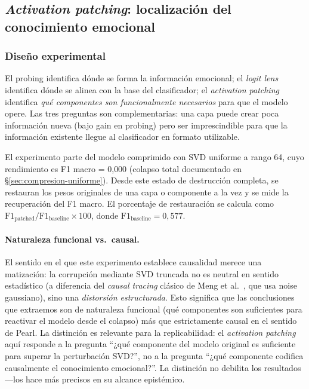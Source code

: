 \subsection{\emph{Activation patching}: localización del conocimiento emocional}
\label{sec:activation-patching}

\subsubsection{Diseño experimental}

El probing identifica dónde se forma la información emocional;
el \emph{logit lens} identifica dónde se alinea con la base del
clasificador; el \emph{activation patching} identifica \emph{qué componentes
son funcionalmente necesarios} para que el modelo opere. Las tres
preguntas son complementarias: una capa puede crear poca información
nueva (bajo gain en probing) pero ser imprescindible para que la
información existente llegue al clasificador en formato utilizable.

El experimento parte del modelo comprimido con SVD uniforme a rango 64,
cuyo rendimiento es F1 macro = 0{,}000 (colapso total documentado en
\S\ref{sec:compresion-uniforme}). Desde este estado de destrucción
completa, se restauran los pesos originales de una capa o componente
a la vez y se mide la recuperación del F1 macro. El porcentaje de
restauración se calcula como
$\text{F1}_{\text{patched}} / \text{F1}_{\text{baseline}} \times 100$,
donde $\text{F1}_{\text{baseline}} = 0{,}577$.

\paragraph{Naturaleza funcional vs.\ causal.}
El sentido en el que este experimento establece causalidad merece una matización: la corrupción mediante SVD truncada no es neutral
en sentido estadístico (a diferencia del \emph{causal tracing} clásico de
Meng et al.~\cite{meng2022locating}, que usa noise gaussiano), sino una
\emph{distorsión estructurada}. Esto significa que las conclusiones
que extraemos son de naturaleza funcional (qué componentes
son suficientes para reactivar el modelo desde el colapso) más que
estrictamente causal en el sentido de Pearl. La distinción es
relevante para la replicabilidad: el \emph{activation patching} aquí responde
a la pregunta ``¿qué componente del modelo original es suficiente
para superar la perturbación SVD?'', no a la pregunta ``¿qué
componente codifica causalmente el conocimiento emocional?''. La
distinción no debilita los resultados ---los hace más precisos en su
alcance epistémico.

